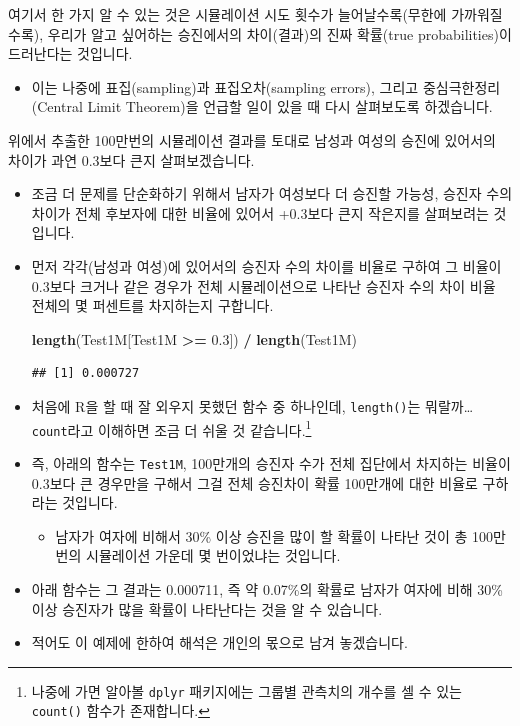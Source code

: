 \documentclass[]{book}
\newenvironment{Shaded}{\begin{snugshade}}{\end{snugshade}}
\newcommand{\FloatTok}[1]{\textcolor[rgb]{0.00,0.00,0.81}{#1}}
\newcommand{\KeywordTok}[1]{\textcolor[rgb]{0.13,0.29,0.53}{\textbf{#1}}}
\newcommand{\NormalTok}[1]{#1}
\newcommand{\OperatorTok}[1]{\textcolor[rgb]{0.81,0.36,0.00}{\textbf{#1}}}
\newcommand{\StringTok}[1]{\textcolor[rgb]{0.31,0.60,0.02}{#1}}
\providecommand{\tightlist}{%
  \setlength{\itemsep}{0pt}\setlength{\parskip}{0pt}}
\let\rmarkdownfootnote\footnote%
\def\footnote{\protect\rmarkdownfootnote}
\begin{document}
여기서 한 가지 알 수 있는 것은 시뮬레이션 시도 횟수가 늘어날수록(무한에 가까워질수록), 우리가 알고 싶어하는 승진에서의 차이(결과)의 진짜 확률(true probabilities)이 드러난다는 것입니다.

\begin{itemize}
\tightlist
\item
  이는 나중에 표집(sampling)과 표집오차(sampling errors), 그리고 중심극한정리(Central Limit Theorem)을 언급할 일이 있을 때 다시 살펴보도록 하겠습니다.
\end{itemize}

위에서 추출한 100만번의 시뮬레이션 결과를 토대로 남성과 여성의 승진에 있어서의 차이가 과연 0.3보다 큰지 살펴보겠습니다.

\begin{itemize}
\item
  조금 더 문제를 단순화하기 위해서 남자가 여성보다 더 승진할 가능성, 승진자 수의 차이가 전체 후보자에 대한 비율에 있어서 +0.3보다 큰지 작은지를 살펴보려는 것입니다.
\item
  먼저 각각(남성과 여성)에 있어서의 승진자 수의 차이를 비율로 구하여 그 비율이 0.3보다 크거나 같은 경우가 전체 시뮬레이션으로 나타난 승진자 수의 차이 비율 전체의 몇 퍼센트를 차지하는지 구합니다.

\begin{Shaded}
\begin{Highlighting}[]
\KeywordTok{length}\NormalTok{(Test1M[Test1M }\OperatorTok{>=}\StringTok{ }\FloatTok{0.3}\NormalTok{]) }\OperatorTok{/}\StringTok{ }\KeywordTok{length}\NormalTok{(Test1M)}
\end{Highlighting}
\end{Shaded}

\begin{verbatim}
## [1] 0.000727
\end{verbatim}
\item
  처음에 R을 할 때 잘 외우지 못했던 함수 중 하나인데, \texttt{length()}는 뭐랄까\ldots{} \texttt{count}라고 이해하면 조금 더 쉬울 것 같습니다.\footnote{나중에 가면 알아볼 \texttt{dplyr} 패키지에는 그룹별 관측치의 개수를 셀 수 있는 \texttt{count()} 함수가 존재합니다.}
\item
  즉, 아래의 함수는 \texttt{Test1M}, 100만개의 승진자 수가 전체 집단에서 차지하는 비율이 0.3보다 큰 경우만을 구해서 그걸 전체 승진차이 확률 100만개에 대한 비율로 구하라는 것입니다.

  \begin{itemize}
  \tightlist
  \item
    남자가 여자에 비해서 30\% 이상 승진을 많이 할 확률이 나타난 것이 총 100만번의 시뮬레이션 가운데 몇 번이었냐는 것입니다.
  \end{itemize}
\item
  아래 함수는 그 결과는 0.000711, 즉 약 0.07\%의 확률로 남자가 여자에 비해 30\% 이상 승진자가 많을 확률이 나타난다는 것을 알 수 있습니다.
\item
  적어도 이 예제에 한하여 해석은 개인의 몫으로 남겨 놓겠습니다.
\end{itemize}
\end{document}

